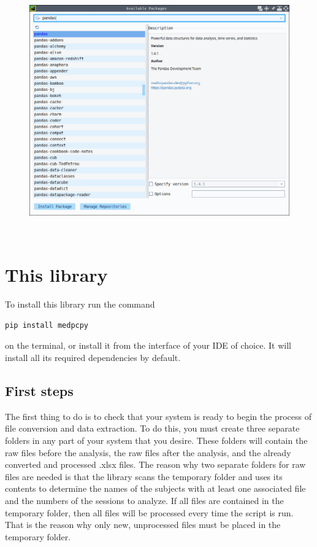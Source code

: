 \documentclass[a4paper,12pt]{article}
\begin{document}
\begin{figure}[!ht]
    \begin{center}
        \includegraphics[scale=0.4]{pycharm-library-install.png}
    \end{center}
\end{figure}

\newpage
\ 
\newpage
\section{This library}

To install this library run the command

\begin{tcolorbox}[
    enhanced,
    attach boxed title to top left={xshift=6mm,yshift=-3mm},
    colback=lightgreen!20,
    colframe=lightgreen,
    sharp corners,
    ]
    \begin{verbatim}
pip install medpcpy
    \end{verbatim}
\end{tcolorbox}

\noindent on the terminal, or install it from the interface of your IDE of choice. It will install all its required dependencies by default.

\subsection{First steps}

The first thing to do is to check that your system is ready to begin the process of file conversion and data extraction. To do this, you must create three separate folders in any part of your system that you desire. These folders will contain the raw files before the analysis, the raw files after the analysis, and the already converted and processed .xlsx files. The reason why two separate folders for raw files are needed is that the library scans the temporary folder and uses its contents to determine the names of the subjects with at least one associated file and the numbers of the sessions to analyze. If all files are contained in the temporary folder, then all files will be processed every time the script is run. That is the reason why only new, unprocessed files must be placed in the temporary folder.
\end{document}
